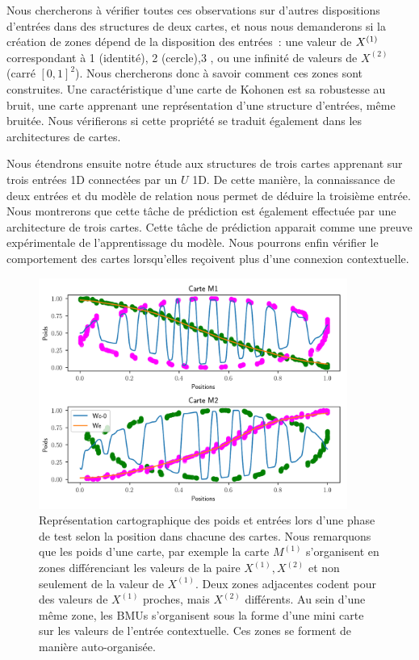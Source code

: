 \documentclass[../main]{subfiles}
\begin{document}
Nous chercherons à vérifier toutes ces observations sur d'autres dispositions d'entrées dans des structures de deux cartes, et nous nous demanderons si la création de zones dépend de la disposition des entrées~: une valeur de $X^{({1})}$ correspondant à 1 (identité), 2 (cercle),3 , ou une infinité de valeurs de $X^{(2)}$ (carré $[0,1]^2$). Nous chercherons donc à savoir comment ces zones sont construites. Une caractéristique d'une carte de Kohonen est sa robustesse au bruit, une carte apprenant une représentation d'une structure d'entrées, même bruitée. 
Nous vérifierons si cette propriété se traduit également dans les architectures de cartes.

Nous étendrons ensuite notre étude aux structures de trois cartes apprenant sur trois entrées 1D connectées par un $U$ 1D. De cette manière, la connaissance de deux entrées et du modèle de relation nous permet de déduire la troisième entrée. Nous montrerons que cette tâche de prédiction est également effectuée par une architecture de trois cartes. Cette tâche de prédiction apparait comme une preuve expérimentale de l'apprentissage du modèle.
Nous pourrons enfin vérifier le comportement des cartes lorsqu'elles reçoivent plus d'une connexion contextuelle.

\begin{figure}
	\centering\includegraphics[width=0.9\textwidth]{2som_cercle_w.pdf}
	\caption{Représentation cartographique des poids et entrées lors d'une phase de test selon la position dans chacune des cartes. Nous remarquons que les poids d'une carte, par exemple la carte $M^{(1)}$ s'organisent en zones différenciant les valeurs de la paire $X^{(1)}, X^{(2)}$ et non seulement de la valeur de $X^{(1)}$. Deux zones adjacentes codent pour des valeurs de $X^{(1)}$ proches, mais $X^{(2)}$ différents. Au sein d'une même zone, les BMUs s'organisent sous la forme d'une mini carte sur les valeurs de l'entrée contextuelle. Ces zones se forment de manière auto-organisée. \label{fig:w}}
\end{figure}
\end{document}
